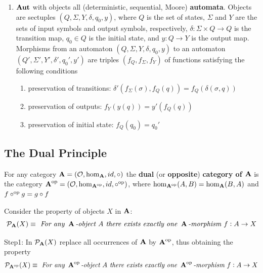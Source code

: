 \documentclass[11pt]{article}
\begin{document}
\begin{examplle}[]
\begin{enumerate}
\begin{enumerate}
\item \(\operatorname{\textbf{Aut}}\) with objects all (deterministic, sequential, Moore) \textbf{automata}.
Objects are sectuples \((Q,\Sigma,Y,\delta,q_0,y)\), where \(Q\) is the set of
states, \(\Sigma\) and \(Y\) are the sets of input symbols and output symbols,
respectively, \(\delta:\Sigma\times Q\to Q\) is the transition map, 
\(q_0\in Q\) is the initial state, and \(y:Q\to Y\) is the output map.
Morphisms from an automaton \((Q,\Sigma,Y,\delta,q_0,y)\) to an automaton
\((Q',\Sigma',Y',\delta',q_0',y')\) are triples \((f_Q,f_{\Sigma},f_Y)\) of
functions satisfying the following conditions
\begin{enumerate}
\item preservation of transitions:
\(\delta'(f_{\Sigma}(\sigma),f_Q(q))=f_Q(\delta(\sigma,q))\)

\item preservation of outputs: \(f_Y(y(q))=y'(f_Q(q))\)

\item preservation of initial state: \(f_Q(q_0)=q_0'\)
\end{enumerate}
\end{enumerate}
\end{enumerate}
\end{examplle}
\subsection{The Dual Principle}
\label{sec:org9ecfb95}
\begin{definition}[]
For any category \(\operatorname{\textbf{A}}=(\mathcal{O},\operatorname{hom}_{\operatorname{\textbf{A}}},id,\circ)\) the \textbf{dual} (or \textbf{opposite})
\textbf{category of \(\operatorname{\textbf{A}}\)} is the category
\(\operatorname{\textbf{A}}^{\operatorname{op}}=(\mathcal{O},\operatorname{hom}_{\operatorname{\textbf{A}}^{\operatorname{op}}},id,\circ^{\operatorname{op}})\), where
\(\operatorname{hom}_{\operatorname{\textbf{A}}^{\operatorname{op}}}(A,B)=\operatorname{hom}_{\operatorname{\textbf{A}}}(B,A)\) and \(f\circ^{\operatorname{op}}g=g\circ f\)
\end{definition}

Consider the property of objects \(X\) in \(\operatorname{\textbf{A}}\):
\begin{equation*}
\mathcal{P}_{\operatorname{\textbf{A}}}(X)\equiv \textit{ For any } \operatorname{\textbf{A}}\textit{-object } A
\textit{ there exists exactly one }
\operatorname{\textbf{A}}\textit{-morphism } f:A\to X
\end{equation*}

Step1: In \(\mathcal{P}_{\operatorname{\textbf{A}}}(X)\) replace all occurrences of \(\operatorname{\textbf{A}}\) by \(\operatorname{\textbf{A}}^{\operatorname{op}}\),
thus obtaining the property
\begin{equation*}
\mathcal{P}_{\operatorname{\textbf{A}}^{\operatorname{op}}}(X)\equiv \textit{ For any } \operatorname{\textbf{A}}^{\operatorname{op}}\textit{-object } A
\textit{ there exists exactly one }
\operatorname{\textbf{A}}^{\operatorname{op}}\textit{-morphism } f:A\to X
\end{equation*}
\end{document}
